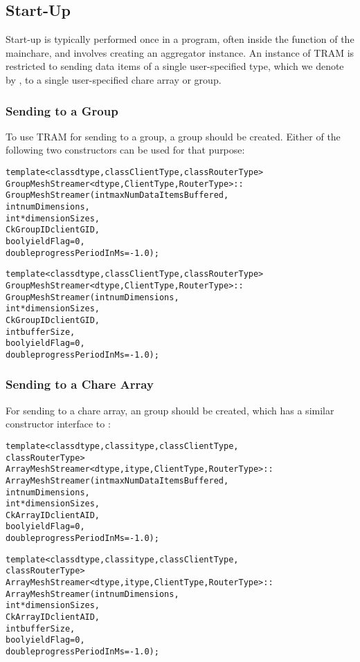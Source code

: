 \subsection{Start-Up}

Start-up is typically performed once in a program, often inside the 
function of the mainchare, and involves creating an aggregator instance. An
instance of TRAM is restricted to sending data items of a single user-specified
type, which we denote by , to a single user-specified chare array or
group.

\subsubsection{Sending to a Group}
To use TRAM for sending to a group, a  group should be
created. Either of the following two  constructors can
be used for that purpose:

\begin{alltt}
template<class dtype, class ClientType, class RouterType>
GroupMeshStreamer<dtype, ClientType, RouterType>::
GroupMeshStreamer(int maxNumDataItemsBuffered,
                  int numDimensions,
                  int *dimensionSizes,
                  CkGroupID clientGID,
                  bool yieldFlag = 0,
                  double progressPeriodInMs = -1.0);

template<class dtype, class ClientType, class RouterType>
GroupMeshStreamer<dtype, ClientType, RouterType>::
GroupMeshStreamer(int numDimensions,
                  int *dimensionSizes,
                  CkGroupID clientGID,
                  int bufferSize,
                  bool yieldFlag = 0,
                  double progressPeriodInMs = -1.0);

\end{alltt}

\subsubsection{Sending to a Chare Array}
For sending to a chare array, an  group should be
created, which has a similar constructor interface to :

\begin{alltt}
template <class dtype, class itype, class ClientType,
          class RouterType>
ArrayMeshStreamer<dtype, itype, ClientType, RouterType>::
ArrayMeshStreamer(int maxNumDataItemsBuffered,
                  int numDimensions,
                  int *dimensionSizes,
                  CkArrayID clientAID,
                  bool yieldFlag = 0,
                  double progressPeriodInMs = -1.0);

template <class dtype, class itype, class ClientType,
          class RouterType>
ArrayMeshStreamer<dtype, itype, ClientType, RouterType>::
ArrayMeshStreamer(int numDimensions,
                  int *dimensionSizes,
                  CkArrayID clientAID,
                  int bufferSize,
                  bool yieldFlag = 0,
                  double progressPeriodInMs = -1.0);

\end{alltt}

